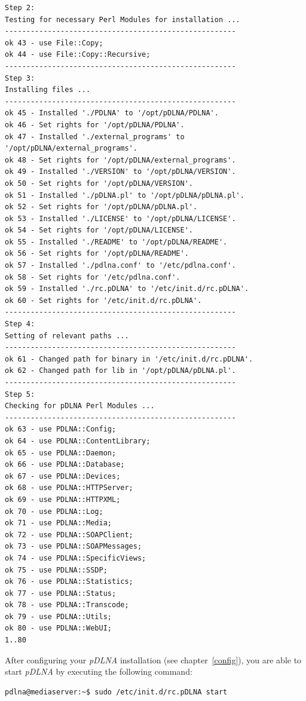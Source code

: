\documentclass[a4paper,oneside,10pt]{report}
\newenvironment{colframecmd}{%
  \begin{Sbox}
    \begin{minipage}{.99\columnwidth}
}{%
  \end{minipage}
  \end{Sbox}
  \begin{center}
    \fcolorbox{black}{LightSteelBlue}{\TheSbox}
  \end{center}
}
\begin{document}
\begin{colframecmd}
\begin{verbatim}
Step 2:
Testing for necessary Perl Modules for installation ...
------------------------------------------------------
ok 43 - use File::Copy;
ok 44 - use File::Copy::Recursive;
------------------------------------------------------
Step 3:
Installing files ...
------------------------------------------------------
ok 45 - Installed './PDLNA' to '/opt/pDLNA/PDLNA'.
ok 46 - Set rights for '/opt/pDLNA/PDLNA'.
ok 47 - Installed './external_programs' to '/opt/pDLNA/external_programs'.
ok 48 - Set rights for '/opt/pDLNA/external_programs'.
ok 49 - Installed './VERSION' to '/opt/pDLNA/VERSION'.
ok 50 - Set rights for '/opt/pDLNA/VERSION'.
ok 51 - Installed './pDLNA.pl' to '/opt/pDLNA/pDLNA.pl'.
ok 52 - Set rights for '/opt/pDLNA/pDLNA.pl'.
ok 53 - Installed './LICENSE' to '/opt/pDLNA/LICENSE'.
ok 54 - Set rights for '/opt/pDLNA/LICENSE'.
ok 55 - Installed './README' to '/opt/pDLNA/README'.
ok 56 - Set rights for '/opt/pDLNA/README'.
ok 57 - Installed './pdlna.conf' to '/etc/pdlna.conf'.
ok 58 - Set rights for '/etc/pdlna.conf'.
ok 59 - Installed './rc.pDLNA' to '/etc/init.d/rc.pDLNA'.
ok 60 - Set rights for '/etc/init.d/rc.pDLNA'.
------------------------------------------------------
Step 4:
Setting of relevant paths ...
------------------------------------------------------
ok 61 - Changed path for binary in '/etc/init.d/rc.pDLNA'.
ok 62 - Changed path for lib in '/opt/pDLNA/pDLNA.pl'.
------------------------------------------------------
Step 5:
Checking for pDLNA Perl Modules ...
------------------------------------------------------
ok 63 - use PDLNA::Config;
ok 64 - use PDLNA::ContentLibrary;
ok 65 - use PDLNA::Daemon;
ok 66 - use PDLNA::Database;
ok 67 - use PDLNA::Devices;
ok 68 - use PDLNA::HTTPServer;
ok 69 - use PDLNA::HTTPXML;
ok 70 - use PDLNA::Log;
ok 71 - use PDLNA::Media;
ok 72 - use PDLNA::SOAPClient;
ok 73 - use PDLNA::SOAPMessages;
ok 74 - use PDLNA::SpecificViews;
ok 75 - use PDLNA::SSDP;
ok 76 - use PDLNA::Statistics;
ok 77 - use PDLNA::Status;
ok 78 - use PDLNA::Transcode;
ok 79 - use PDLNA::Utils;
ok 80 - use PDLNA::WebUI;
1..80
\end{verbatim}
\end{colframecmd}

After configuring your {\em pDLNA} installation (see chapter~\ref{config}), you are able to start {\em pDLNA} by executing the following command:
\begin{colframecmd}
\begin{verbatim}
pdlna@mediaserver:~$ sudo /etc/init.d/rc.pDLNA start
\end{verbatim}
\end{colframecmd}
\end{document}
